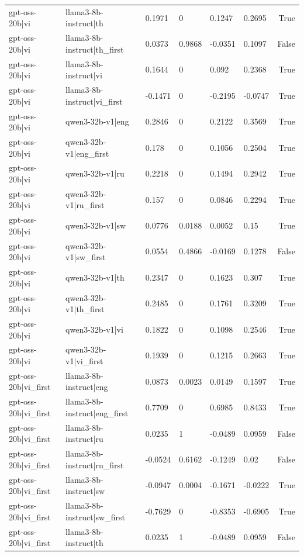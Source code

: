\begin{table}
\begin{tabular}{llllllr}
gpt-oss-20b|vi & llama3-8b-instruct|th & 0.1971 & 0 & 0.1247 & 0.2695 & True \\
gpt-oss-20b|vi & llama3-8b-instruct|th_first & 0.0373 & 0.9868 & -0.0351 & 0.1097 & False \\
gpt-oss-20b|vi & llama3-8b-instruct|vi & 0.1644 & 0 & 0.092 & 0.2368 & True \\
gpt-oss-20b|vi & llama3-8b-instruct|vi_first & -0.1471 & 0 & -0.2195 & -0.0747 & True \\
gpt-oss-20b|vi & qwen3-32b-v1|eng & 0.2846 & 0 & 0.2122 & 0.3569 & True \\
gpt-oss-20b|vi & qwen3-32b-v1|eng_first & 0.178 & 0 & 0.1056 & 0.2504 & True \\
gpt-oss-20b|vi & qwen3-32b-v1|ru & 0.2218 & 0 & 0.1494 & 0.2942 & True \\
gpt-oss-20b|vi & qwen3-32b-v1|ru_first & 0.157 & 0 & 0.0846 & 0.2294 & True \\
gpt-oss-20b|vi & qwen3-32b-v1|sw & 0.0776 & 0.0188 & 0.0052 & 0.15 & True \\
gpt-oss-20b|vi & qwen3-32b-v1|sw_first & 0.0554 & 0.4866 & -0.0169 & 0.1278 & False \\
gpt-oss-20b|vi & qwen3-32b-v1|th & 0.2347 & 0 & 0.1623 & 0.307 & True \\
gpt-oss-20b|vi & qwen3-32b-v1|th_first & 0.2485 & 0 & 0.1761 & 0.3209 & True \\
gpt-oss-20b|vi & qwen3-32b-v1|vi & 0.1822 & 0 & 0.1098 & 0.2546 & True \\
gpt-oss-20b|vi & qwen3-32b-v1|vi_first & 0.1939 & 0 & 0.1215 & 0.2663 & True \\
gpt-oss-20b|vi_first & llama3-8b-instruct|eng & 0.0873 & 0.0023 & 0.0149 & 0.1597 & True \\
gpt-oss-20b|vi_first & llama3-8b-instruct|eng_first & 0.7709 & 0 & 0.6985 & 0.8433 & True \\
gpt-oss-20b|vi_first & llama3-8b-instruct|ru & 0.0235 & 1 & -0.0489 & 0.0959 & False \\
gpt-oss-20b|vi_first & llama3-8b-instruct|ru_first & -0.0524 & 0.6162 & -0.1249 & 0.02 & False \\
gpt-oss-20b|vi_first & llama3-8b-instruct|sw & -0.0947 & 0.0004 & -0.1671 & -0.0222 & True \\
gpt-oss-20b|vi_first & llama3-8b-instruct|sw_first & -0.7629 & 0 & -0.8353 & -0.6905 & True \\
gpt-oss-20b|vi_first & llama3-8b-instruct|th & 0.0235 & 1 & -0.0489 & 0.0959 & False \\

\end{tabular}
\end{table}
